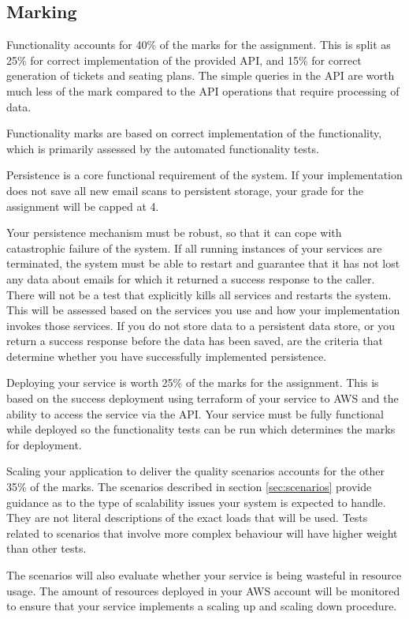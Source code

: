 \documentclass{csse4400}
\begin{document}
\subsection{Marking}
Functionality accounts for 40\% of the marks for the assignment. This is split as 25\% for correct implementation of the provided API, and 15\% for correct generation of tickets and seating plans. The simple queries in the API are worth much less of the mark compared to the API operations that require processing of data.

Functionality marks are based on correct implementation of the functionality, which is primarily assessed by the automated functionality tests.

Persistence is a core functional requirement of the system. If your implementation does not save all new email scans to persistent storage, your grade for the assignment will be capped at 4.

Your persistence mechanism must be robust, so that it can cope with catastrophic failure of the system. If all running instances of your services are terminated, the system must be able to restart and guarantee that it has not lost any data about emails for which it returned a success response to the caller. There will not be a test that explicitly kills all services and restarts the system. This will be assessed based on the services you use and how your implementation invokes those services. If you do not store data to a persistent data store, or you return a success response before the data has been saved, are the criteria that determine whether you have successfully implemented persistence.

Deploying your service is worth 25\% of the marks for the assignment. This is based on the success deployment using terraform of your service to AWS and the ability to access the service via the API. Your service must be fully functional while deployed so the functionality tests can be run which determines the marks for deployment.

Scaling your application to deliver the quality scenarios accounts for the other 35\% of the marks. The scenarios described in section \ref{sec:scenarios} provide guidance as to the type of scalability issues your system is expected to handle. They are not literal descriptions of the exact loads that will be used. Tests related to scenarios that involve more complex behaviour will have higher weight than other tests.

The scenarios will also evaluate whether your service is being wasteful in resource usage. The amount of resources deployed in your AWS account will be monitored to ensure that your service implements a scaling up and scaling down procedure.
\end{document}
